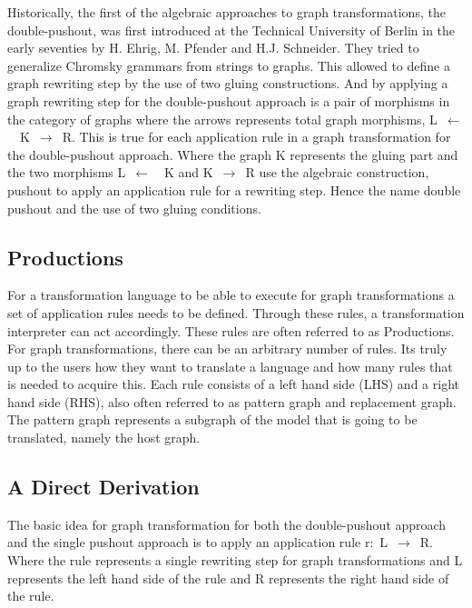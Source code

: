 \documentclass[pdftex,11pt,a4paper]{article}
\begin{document}
\indent Historically, the first of the algebraic approaches to graph
transformations, the double-pushout, was first introduced at the Technical
University of Berlin in the early seventies by H. Ehrig, M. Pfender and H.J.
Schneider\cite{INSPEC:606170}. They tried to generalize Chromsky grammars from
strings to graphs. This allowed to define a graph rewriting step by the use of
two gluing constructions. And by applying a graph rewriting step for the
double-pushout approach is a pair of morphisms in the category of graphs where
the arrows represents total graph morphisms, \linebreak\mbox{L $\longleftarrow$
\ K $\longrightarrow$ R}. This is true for each application rule in a graph
transformation for the double-pushout approach. Where the graph K represents the
gluing part and the two morphisms \mbox{L $\longleftarrow$ \ K} and \mbox{K
$\longrightarrow$ R} use the algebraic construction, pushout to apply an
application rule for a rewriting step. Hence the name double pushout and the use
of two gluing conditions.

\subsection{Productions}
\noindent For a transformation language to be able to execute for graph
transformations a set of application rules needs to be defined. Through these
rules, a transformation interpreter can act accordingly. These rules are often
referred to as Productions. For graph transformations, there can be an arbitrary
number of rules. Its truly up to the users how they want to translate a
language and how many rules that is needed to acquire this. Each rule consists
of a left hand side (LHS) and a right hand side (RHS), also often referred to as
pattern graph and replacement graph. The pattern graph represents a subgraph of
the model that is going to be translated, namely the host graph.

\subsection{A Direct Derivation}
\noindent The basic idea for graph transformation for both the double-pushout
approach and the single pushout approach is to apply an application rule
\mbox{r: L $\longrightarrow$ R}. Where the rule represents a single rewriting
step for graph transformations and L represents the left hand side of the rule and R
represents the right hand side of the rule.
\end{document}
